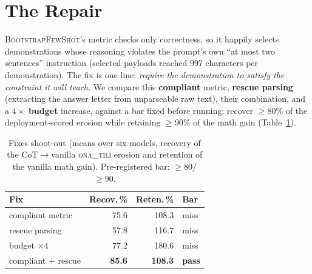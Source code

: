 \documentclass[11pt]{article}
\newcommand{\ona}{\textsc{ona\_tili}}
\newcommand{\bsfs}{\textsc{BootstrapFewShot}}
\begin{document}
\section{The Repair}\label{sec:fixes}

\bsfs{}'s metric checks only correctness, so it happily selects demonstrations whose
reasoning violates the prompt's own ``at most two sentences'' instruction (selected
payloads reached $997$ characters per demonstration). The fix is one line:
\emph{require the demonstration to satisfy the constraint it will teach}. We compare
this \textbf{compliant} metric, \textbf{rescue parsing} (extracting the answer letter
from unparseable raw text), their combination, and a $4\times$ \textbf{budget}
increase, against a bar fixed before running: recover ${\ge}80\%$ of the
deployment-scored erosion while retaining ${\ge}90\%$ of the math gain
(Table~\ref{tab:fixes}).

\begin{table}[t]\centering\small
\caption{Fixes shoot-out (means over six models, recovery of the CoT${\to}$vanilla
\ona{} erosion and retention of the vanilla math gain). Pre-registered bar:
${\ge}80$/${\ge}90$.}
\label{tab:fixes}
\setlength{\tabcolsep}{5pt}
\begin{tabular}{lrrl}
\toprule
Fix & Recov.\,\% & Reten.\,\% & Bar \\
\midrule
compliant metric      & 75.6 & 108.3 & miss \\
rescue parsing        & 57.8 & 116.7 & miss \\
budget $\times4$      & 77.2 & 180.6 & miss \\
compliant $+$ rescue  & \textbf{85.6} & \textbf{108.3} & \textbf{pass} \\
\bottomrule
\end{tabular}
\end{table}
\end{document}
